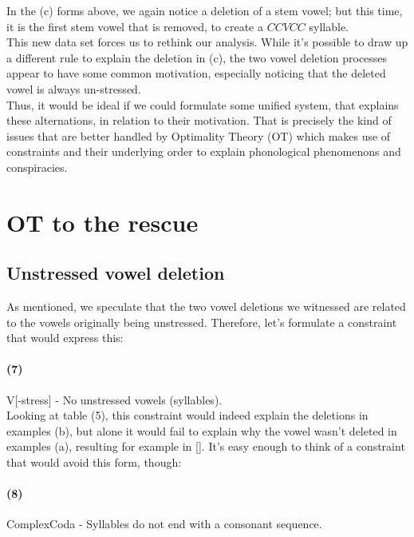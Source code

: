 \documentclass[12pt,draft]{article}
\begin{document}
In the (c) forms above, we again notice a deletion of a stem vowel; but this time, it is the first stem vowel that is removed, to create a $CCVCC$ syllable.
\\

This new data set forces us to rethink our analysis.
While it's possible to draw up a different rule to explain the deletion in (c), the two vowel deletion processes appear to have some common motivation, especially noticing that the deleted vowel is always un-stressed.
\\

Thus, it would be ideal if we could formulate some unified system, that explains these alternations, in relation to their motivation.
That is precisely the kind of issues that are better handled by Optimality Theory (OT) which makes use of constraints and their underlying order to explain phonological phenomenons and conspiracies. 

\pagebreak

\section {OT to the rescue}

\subsection {Unstressed vowel deletion}

As mentioned, we speculate that the two vowel deletions we witnessed are related to the vowels originally being unstressed.
Therefore, let's formulate a constraint that would express this:

\paragraph*{(7)} {{\sc *V[-stress]} - No unstressed vowels (syllables).}
\\

Looking at table (5), this constraint would indeed explain the deletions in examples (b), but alone it would fail to explain why the vowel wasn't deleted in examples (a), resulting for example in [].
It's easy enough to think of a constraint that would avoid this form, though:

\paragraph*{(8)} {{\sc *ComplexCoda} - Syllables do not end with a consonant sequence.}
\\
\end{document}
